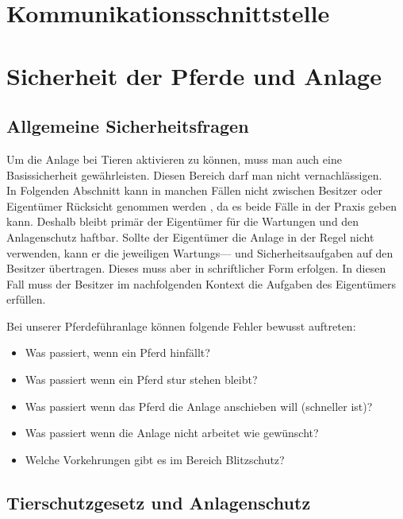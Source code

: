 \documentclass[12pt]{scrreprt} %
\begin{document}
\section{Kommunikationsschnittstelle}
\label{sec:kommunikationsschnittstelle}
\newpage
\section{Sicherheit der Pferde und Anlage}
\label{sec:sicherheitDerPferdeUndAnlage}

\subsection{Allgemeine Sicherheitsfragen}
\label{sec:allgemeineSicherheitsfragen}

Um die Anlage bei Tieren aktivieren zu können, muss man auch eine Basissicherheit gewährleisten.
Diesen Bereich darf man nicht vernachlässigen. \\ In Folgenden Abschnitt  kann in manchen Fällen nicht zwischen Besitzer oder Eigentümer Rücksicht genommen werden , da es beide Fälle in der Praxis geben kann. Deshalb bleibt primär der Eigentümer für die Wartungen und den Anlagenschutz haftbar. Sollte der Eigentümer die Anlage in der Regel nicht verwenden, kann er die jeweiligen Wartungs--- und Sicherheitsaufgaben auf den Besitzer übertragen. Dieses muss aber in schriftlicher Form erfolgen. In diesen Fall muss der Besitzer im nachfolgenden Kontext die Aufgaben des Eigentümers erfüllen.

Bei unserer Pferdeführanlage können folgende Fehler bewusst auftreten:

\begin{itemize}
\item{Was passiert, wenn ein Pferd hinfällt?}
\item{Was passiert wenn ein Pferd stur stehen bleibt?}
\item{Was passiert wenn das Pferd die Anlage anschieben will (schneller ist)?}
\item{Was passiert wenn die Anlage nicht arbeitet wie gewünscht?}
\item{Welche Vorkehrungen gibt es im Bereich Blitzschutz?}
\end{itemize}

\subsection{Tierschutzgesetz und Anlagenschutz}
\label{sec:tierschutzgesetzUndAnlagenschutz}
\end{document}
